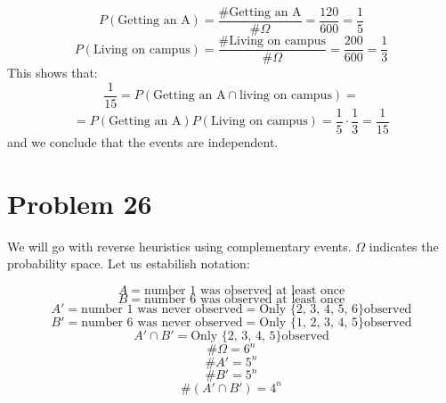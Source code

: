 \documentclass{article}
\begin{document}
\begin{equation*}
    P(\mbox{Getting an A}) = \frac{\# \mbox{Getting an A} }{\# \Omega} = \frac{120}{600} = \frac{1}{5}
\end{equation*}
\begin{equation*}
    P(\mbox{Living on campus}) = \frac{\# \mbox{Living on campus}}{\# \Omega} = \frac{200}{600} = \frac{1}{3}
\end{equation*}
This shows that:
\begin{equation*}
    \frac{1}{15} = P(\mbox{Getting an A} \cap \mbox{living on campus}) = 
\end{equation*}
\begin{equation*}
    = P(\mbox{Getting an A}) P(\mbox{Living on campus}) = \frac{1}{5} \cdot \frac{1}{3} = \frac{1}{15}
\end{equation*}
and we conclude that the events are independent.

\section*{Problem 26}

We will go with reverse heuristics using complementary events.
\(\Omega\) indicates the probability space. Let us estabilish notation:

\begin{equation*}
    A = \mbox{number \(1\) was observed at least once}
\end{equation*}
\begin{equation*}
    B = \mbox{number \(6\) was observed at least once}
\end{equation*}
\begin{equation*}
    A' = \mbox{number \(1\) was  never observed} = \mbox{Only \{2, 3, 4, 5, 6\} observed}
\end{equation*}
\begin{equation*}
    B' = \mbox{number \(6\) was  never observed} = \mbox{Only \{1, 2, 3, 4, 5\} observed}
\end{equation*}
\begin{equation*}
    A' \cap B' = \mbox{Only \{2, 3, 4, 5\} observed}
\end{equation*}
\begin{equation*}
    \#\Omega =  6^n
\end{equation*}
\begin{equation*}
    \#A' = 5^n
\end{equation*}
\begin{equation*}
    \#B' =  5^n
\end{equation*}
\begin{equation*}
    \#(A' \cap B') = 4^n
\end{equation*}
\end{document}
